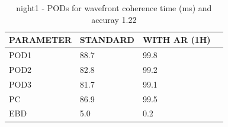 \begin{table}[p!]
\begin{center}
\begin{tabular}{|l|l|l|l|}
\hline
\multicolumn{1}{|c|}{\cellcolor[HTML]{C0C0C0}\textbf{PARAMETER}} & \multicolumn{1}{c|}{\cellcolor[HTML]{C0C0C0}\textbf{STANDARD}} & \multicolumn{1}{c|}{\cellcolor[HTML]{C0C0C0}\textbf{WITH AR (1H)}} \\
\hline
\cellcolor[HTML]{C0C0C0}POD1  & 88.7                                & 99.8         \\
\cellcolor[HTML]{C0C0C0}POD2  & 82.8                                & 99.2         \\
\cellcolor[HTML]{C0C0C0}POD3  & 81.7                                & 99.1         \\
\cellcolor[HTML]{C0C0C0}PC    & 86.9                                  & 99.5           \\
\cellcolor[HTML]{C0C0C0}EBD   & 5.0                                 & 0.2          \\
\hline
\end{tabular}
\caption{night1 - PODs for wavefront coherence time (ms) and accuray 1.22}
\label{tab:podtau1.22:night1}
\end{center}
\end{table}

